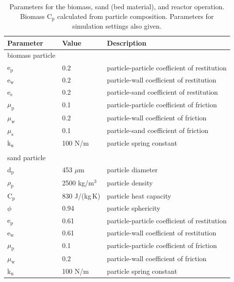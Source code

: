 \documentclass{article}
\begin{document}
\begin{table}[H]
    \centering
    \caption{Parameters for the biomass, sand (bed material), and reactor operation. Biomass C$_\text{p}$ calculated from particle composition. Parameters for simulation settings also given.}
    \label{tab:params}
    \begin{tabular}{lll}
        \toprule
        Parameter & Value & Description \\
        \midrule
        biomass particle \\
        e$_\text{p}$    & 0.2        & particle-particle coefficient of restitution \\
        e$_\text{w}$    & 0.2        & particle-wall coefficient of restitution \\
        e$_\text{s}$    & 0.2        & particle-sand coefficient of restitution \\
        $\mu_\text{p}$  & 0.1        & particle-particle coefficient of friction \\
        $\mu_\text{w}$  & 0.2        & particle-wall coefficient of friction \\
        $\mu_\text{s}$  & 0.1        & particle-sand coefficient of friction \\
        k$_\text{n}$    & 100 N/m    & particle spring constant \\
        \\
        sand particle \\
        d$_\text{p}$       & 453 $\mu$m          & particle diameter \\
        $\rho_\text{p}$    & 2500 kg/m$^3$       & particle density \\
        C$_\text{p}$       & 830 J/(kg\,K)      & particle heat capacity \\
        $\phi$             & 0.94                & particle sphericity \\
        e$_\text{p}$       & 0.61                & particle-particle coefficient of restitution \\
        e$_\text{w}$       & 0.61                & particle-wall coefficient of restitution \\
        $\mu_\text{p}$     & 0.1                 & particle-particle coefficient of friction \\
        $\mu_\text{w}$     & 0.2                 & particle-wall coefficient of friction \\
        k$_\text{n}$       & 100 N/m             & particle spring constant \\

\end{tabular}
\end{table}
\end{document}
